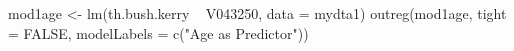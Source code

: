 \begin{Schunk}
\begin{Sinput}
 mod1age <- lm(th.bush.kerry ~ V043250, data = mydta1)
 outreg(mod1age, tight = FALSE, modelLabels = c("Age as Predictor"))
\end{Sinput}
\end{Schunk}
